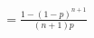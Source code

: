 \documentclass[preview]{standalone}
\begin{document}
\begin{align*}
= \frac{1 - (1-p)^{n+1}}{(n+1)p}
\end{align*}
\end{document}
